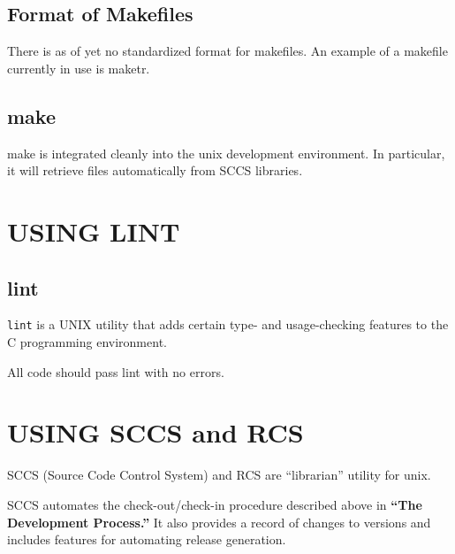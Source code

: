 \subsection{Format of Makefiles}

There is as of yet no standardized format for makefiles.  An example
of a makefile currently in use is maketr.

\subsection{make}

make is integrated cleanly into the unix development environment.  In
particular, it will retrieve files automatically from SCCS libraries.

\section{USING LINT}

\subsection{lint}

{\tt lint} is a UNIX utility that adds certain type- and
usage-checking features to the C programming environment.

All code should pass lint with no errors.

\section{USING SCCS and RCS}
SCCS (Source Code Control System) and RCS  are
``librarian'' utility for unix.

SCCS automates the check-out/check-in procedure described above in
{\bf ``The Development Process.''}  It also provides a record of
changes to versions and includes features for automating release
generation.

